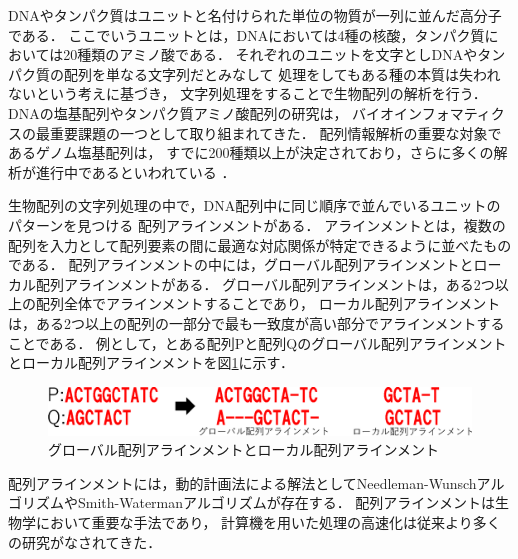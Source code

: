 DNAやタンパク質はユニットと名付けられた単位の物質が一列に並んだ高分子である．
ここでいうユニットとは，DNAにおいては4種の核酸，タンパク質においては20種類のアミノ酸である．
それぞれのユニットを文字としDNAやタンパク質の配列を単なる文字列だとみなして
処理をしてもある種の本質は失われないという考えに基づき，
文字列処理をすることで生物配列の解析を行う．
DNAの塩基配列やタンパク質アミノ酸配列の研究は，
バイオインフォマティクスの最重要課題の一つとして取り組まれてきた．
配列情報解析の重要な対象であるゲノム塩基配列は，
すでに200種類以上が決定されており，さらに多くの解析が進行中であるといわれている
\cite{浅井潔2005バイオインフォマティクス}．

生物配列の文字列処理の中で，DNA配列中に同じ順序で並んでいるユニットのパターンを見つける
配列アラインメントがある\cite{須戸里織2011バイオインフォマティクスゲノム配列から
機能解析へバイオインフォマティクスゲノム配列から機能解析へ}．
アラインメントとは，複数の配列を入力として配列要素の間に最適な対応関係が特定できるように並べたものである．
配列アラインメントの中には，グローバル配列アラインメントとローカル配列アラインメントがある．
グローバル配列アラインメントは，ある2つ以上の配列全体でアラインメントすることであり，
ローカル配列アラインメントは，ある2つ以上の配列の一部分で最も一致度が高い部分でアラインメントすることである．
例として，とある配列Pと配列Qのグローバル配列アラインメントとローカル配列アラインメントを図\ref{fig:grlc}に示す．
\begin{figure}[t!]
\begin{center}
\includegraphics[keepaspectratio,scale=0.5]{fig/2/grlc.eps}
\caption{グローバル配列アラインメントとローカル配列アラインメント}
\label{fig:grlc}
\end{center}
\end{figure}

配列アラインメントには，動的計画法による解法としてNeedleman-Wunschアルゴリズム\cite{needleman1970general}やSmith-Watermanアルゴリズム\cite{smith1981identification}が存在する．
配列アラインメントは生物学において重要な手法であり，
計算機を用いた処理の高速化は従来より多くの研究がなされてきた\cite{須戸里織2011gpu,宗川裕馬2008統合開発環境,sandes2011smith,liu2015accelerating,伊野文彦2007gpu}．

